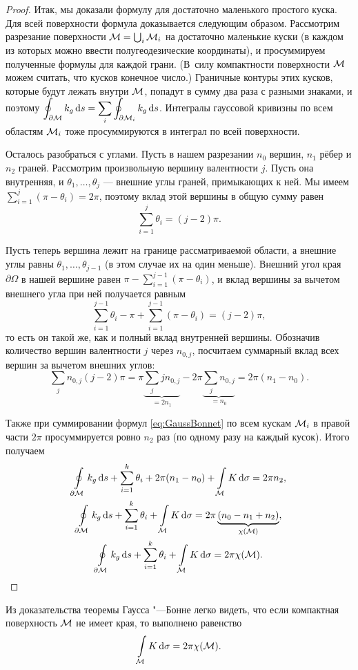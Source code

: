 \begin{proof}
	Итак, мы доказали формулу для достаточно маленького простого куска. Для всей поверхности формула доказывается следующим образом. Рассмотрим разрезание поверхности $\mathcal{M} = \bigcup_i\mathcal{M}_i$ на достаточно маленькие куски (в каждом из которых можно ввести полугеодезические координаты), и просуммируем полученные формулы для каждой грани. (В~силу компактности поверхности $\mathcal{M}$ можем считать, что кусков конечное число.) Граничные контуры этих кусков, которые будут лежать внутри $\mathcal{M}$, попадут в сумму два раза с разными знаками, и поэтому $\displaystyle\oint_{\partial \mathcal{M}}k_g\mathop{}\!\mathrm{d} s = \sum_i\oint_{\partial \mathcal{M}_i}k_g\mathop{}\!\mathrm{d} s$. Интегралы гауссовой кривизны по всем областям $\mathcal{M}_i$ тоже просуммируются в интеграл по всей поверхности.

	Осталось разобраться с углами. Пусть в нашем разрезании $n_0$ вершин, $n_1$ рёбер и $n_2$ граней. Рассмотрим произвольную вершину валентности $j$. Пусть она внутренняя, и $\theta_1, \ldots, \theta_j$ --- внешние углы граней, примыкающих к ней. Мы имеем $\sum\limits_{i = 1}^j(\pi - \theta_i) = 2\pi$, поэтому вклад этой вершины в общую сумму равен
	\[
		\sum_{i = 1}^j\theta_i = (j - 2)\pi.
	\]

	Пусть теперь вершина лежит на границе рассматриваемой области, а внешние углы равны $\theta_1, \ldots, \theta_{j - 1}$ (в этом случае их на один меньше). Внешний угол края $\partial\Omega$ в нашей вершине равен $\pi - \sum\limits_{i = 1}^{j - 1}(\pi - \theta_i)$, и вклад вершины за вычетом внешнего угла при ней получается равным
	\[
		\sum_{i = 1}^{j - 1}\theta_i - \pi + \sum\limits_{i = 1}^{j - 1}(\pi - \theta_i) = (j - 2)\pi,
	\]
	то есть он такой же, как и полный вклад внутренней вершины. Обозначив количество вершин валентности $j$ через $n_{0, j}$, посчитаем суммарный вклад всех вершин за вычетом внешних углов:
	\[
		\sum_jn_{0, j}(j - 2)\pi = \pi{\underbrace{\sum_jjn_{0, j}}_{= 2n_1}} - 2\pi{\underbrace{\sum_jn_{0, j}}_{= n_0}} = 2\pi(n_1 - n_0).
	\]

	Также при суммировании формул \eqref{eq:GaussBonnet} по всем кускам $\mathcal{M}_i$ в правой части $2\pi$ просуммируется ровно $n_2$ раз (по одному разу на каждый кусок). Итого получаем
	\begin{gather*}
		\oint\limits_{\partial\mathcal{M}}k_g\mathop{}\!\mathrm{d} s + \sum_{i = 1}^k\theta_i + 2\pi(n_1 - n_0) + \int\limits_{\mathcal{M}}K\mathop{}\!\mathrm{d}\sigma = 2\pi n_2,\\
		\oint\limits_{\partial\mathcal{M}}k_g\mathop{}\!\mathrm{d} s + \sum_{i = 1}^k\theta_i + \int\limits_{\mathcal{M}}K\mathop{}\!\mathrm{d}\sigma = 2\pi\underbrace{(n_0 - n_1 + n_2)}_{\chi(\mathcal{M})},\\
		\oint\limits_{\partial\mathcal{M}}k_g\mathop{}\!\mathrm{d} s + \sum_{i = 1}^k\theta_i + \int\limits_{\mathcal{M}}K\mathop{}\!\mathrm{d}\sigma = 2\pi\chi(\mathcal{M}).
	\end{gather*}
\end{proof}

Из доказательства теоремы Гаусса "---Бонне легко видеть, что если компактная поверхность $\mathcal{M}$ не имеет края, то выполнено равенство
\[
	\int\limits_{\mathcal{M}}K\mathop{}\!\mathrm{d}\sigma = 2\pi\chi(\mathcal{M}).
\]

